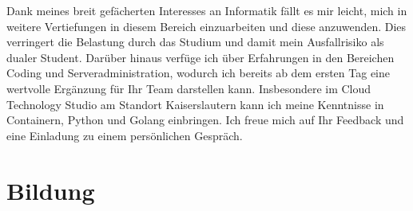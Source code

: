 \documentclass[11pt,a4paper,sans]{moderncv}        %
\begin{document}
Dank meines breit gefächerten Interesses an Informatik fällt es mir leicht, mich in weitere Vertiefungen in diesem Bereich einzuarbeiten und diese anzuwenden. Dies verringert die Belastung durch das Studium und damit mein Ausfallrisiko als dualer Student.\newline \newline
Darüber hinaus verfüge ich über Erfahrungen in den Bereichen Coding und Serveradministration, wodurch ich bereits ab dem ersten Tag eine wertvolle Ergänzung für Ihr Team darstellen kann. Insbesondere im Cloud Technology Studio am Standort Kaiserslautern kann ich meine Kenntnisse in Containern, Python und Golang einbringen.\newline \newline
Ich freue mich auf Ihr Feedback und eine Einladung zu einem persönlichen Gespräch.\newline

\makeletterclosing



\clearpage
\makecvtitle
\section{Bildung}
\end{document}
